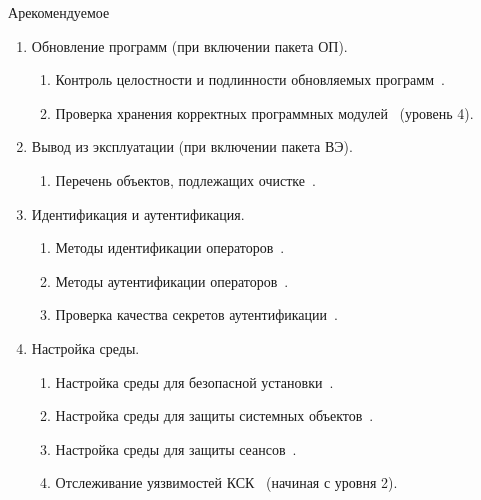 \begin{appendix}{А}{рекомендуемое}
\begin{enumerate}
\begin{enumerate}
\item
Проверка работоспособности~.

\item
Статистическое тестирование~.
\end{enumerate}

\item
Обновление программ (при включении пакета ОП).

\begin{enumerate}
\item
Контроль целостности и подлинности обновляемых программ~.

\item
Проверка хранения корректных программных модулей~ (уровень 4).
\end{enumerate}

\item
Вывод из эксплуатации (при включении пакета ВЭ).

\begin{enumerate}
\item
Перечень объектов, подлежащих очистке~.
\end{enumerate}

\item
{Идентификация и аутентификация.}

\begin{enumerate}
\item
Методы идентификации операторов~.

\item
Методы аутентификации операторов~.

\item
Проверка качества секретов аутентификации~.
\end{enumerate}

\item
{Настройка среды.}

\begin{enumerate}
\item
Настройка среды для безопасной установки~.

\item
Настройка среды для защиты системных объектов~.

\item
Настройка среды для защиты сеансов~.

\item
Отслеживание уязвимостей КСК~ (начиная с уровня 2).


\end{enumerate}
\end{enumerate}
\end{appendix}
